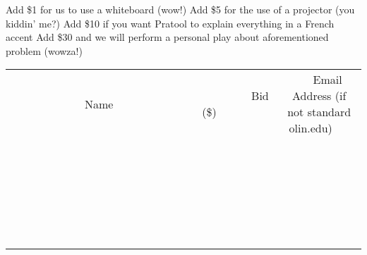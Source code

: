 \documentclass[11pt]{article}
\begin{document}
Add \$1 for us to use a whiteboard (wow!)
Add \$5 for the use of a projector (you kiddin' me?)
Add \$10 if you want Pratool to explain everything in a French accent
Add \$30 and we will perform a personal play about aforementioned problem (wowza!)
\\[6ex]
\begin{tabular}{c c c}
~~~~~~~~~~~~~Name~~~~~~~~~~~~~ & ~~~~~~~~~Bid (\$)~~~~~~~~~  & ~~~Email Address (if not standard olin.edu)~~~\\
 & & \\
\hline
 & & \\
\hline
 & & \\
\hline
 & & \\
\hline
 & & \\
\hline
 & & \\
\hline
 & & \\
\hline
 & & \\
\hline
 & & \\
\hline
 & & \\
\hline
 & & \\
\hline
 & & \\
\hline
 & & \\
\hline
 & & \\
\hline
 & & \\
\hline
 & & \\
\hline
 & & \\
\hline
 & & \\
\hline
 & & \\
\hline
 & & \\
\hline
 & & \\
\hline
 & & \\
\hline
 & & \\
\hline
 & & \\
\hline
 & & \\
\hline
 & & \\
\hline
\end{tabular}
\newpage
\end{document}
